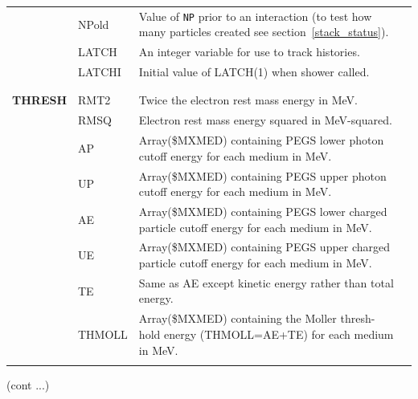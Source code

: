 \begin{table}[htb]
\begin{center}
\begin{tabular}{ l  l   p{105mm}l  |}
	&NPold	& Value of {\tt NP} prior to an interaction (to test how many
		particles created see section~\ref{stack_status}).\\

	&LATCH	&An integer variable for use to track histories.\\

	&LATCHI	&Initial value of LATCH(1) when shower called.\\
&&\\
\hline
&&\\
{\bfseries THRESH}	&RMT2	&Twice the electron rest mass
                            energy in MeV.\\
	&RMSQ	& Electron rest mass energy squared
                            in MeV-squared.\\
	&AP	&Array(\$MXMED) containing PEGS lower photon
                            cutoff energy for each medium in
                            MeV.\\
	&UP	& Array(\$MXMED) containing PEGS upper photon
                            cutoff energy for each medium in
                            MeV.\\
	&AE	&Array(\$MXMED) containing PEGS lower charged
                            particle cutoff energy for each
                            medium in MeV.\\
	&UE	&Array(\$MXMED) containing PEGS upper charged
                            particle cutoff energy for each
                            medium in MeV.\\
	&TE	&Same as AE except kinetic energy
                            rather than total energy.\\
	&THMOLL	&Array(\$MXMED) containing the Moller thresh-
                            hold energy (THMOLL=AE+TE) for
                            each medium in MeV.\\
&&\\
\hline
    \end{tabular}
    \end{center}
    \mbox{}\hfill (cont ...)\\
    \end{table}
    \clearpage

